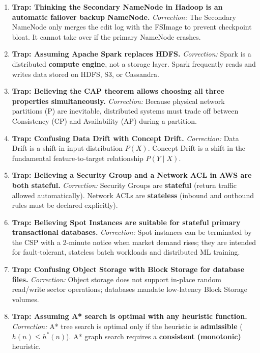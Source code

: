 \begin{enumerate}[label=\arabic*.,leftmargin=2em]
    \item \textbf{Trap: Thinking the Secondary NameNode in Hadoop is an automatic failover backup NameNode.}
    \textit{Correction:} The Secondary NameNode only merges the edit log with the FSImage to prevent checkpoint bloat. It cannot take over if the primary NameNode crashes.

    \item \textbf{Trap: Assuming Apache Spark replaces HDFS.}
    \textit{Correction:} Spark is a distributed \textbf{compute engine}, not a storage layer. Spark frequently reads and writes data stored on HDFS, S3, or Cassandra.

    \item \textbf{Trap: Believing the CAP theorem allows choosing all three properties simultaneously.}
    \textit{Correction:} Because physical network partitions (P) are inevitable, distributed systems must trade off between Consistency (CP) and Availability (AP) during a partition.

    \item \textbf{Trap: Confusing Data Drift with Concept Drift.}
    \textit{Correction:} Data Drift is a shift in input distribution $P(X)$. Concept Drift is a shift in the fundamental feature-to-target relationship $P(Y \mid X)$.

    \item \textbf{Trap: Believing a Security Group and a Network ACL in AWS are both stateful.}
    \textit{Correction:} Security Groups are \textbf{stateful} (return traffic allowed automatically). Network ACLs are \textbf{stateless} (inbound and outbound rules must be declared explicitly).

    \item \textbf{Trap: Believing Spot Instances are suitable for stateful primary transactional databases.}
    \textit{Correction:} Spot instances can be terminated by the CSP with a 2-minute notice when market demand rises; they are intended for fault-tolerant, stateless batch workloads and distributed ML training.

    \item \textbf{Trap: Confusing Object Storage with Block Storage for database files.}
    \textit{Correction:} Object storage does not support in-place random read/write sector operations; databases mandate low-latency Block Storage volumes.

    \item \textbf{Trap: Assuming A* search is optimal with any heuristic function.}
    \textit{Correction:} A* tree search is optimal only if the heuristic is \textbf{admissible} ($h(n) \le h^*(n)$). A* graph search requires a \textbf{consistent (monotonic)} heuristic.


\end{enumerate}
